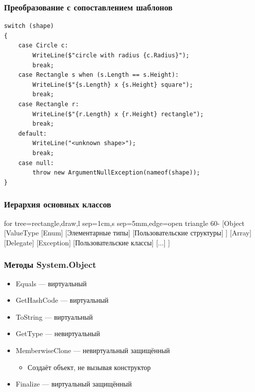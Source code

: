 \documentclass[xetex,mathserif,serif]{beamer}
\begin{document}
	\begin{frame}[fragile]
		\frametitle{Преобразование с сопоставлением шаблонов}
		\begin{small}
			\begin{verbatim}
switch (shape)
{
    case Circle c:
        WriteLine($"circle with radius {c.Radius}");
        break;
    case Rectangle s when (s.Length == s.Height):
        WriteLine($"{s.Length} x {s.Height} square");
        break;
    case Rectangle r:
        WriteLine($"{r.Length} x {r.Height} rectangle");
        break;
    default:
        WriteLine("<unknown shape>");
        break;
    case null:
        throw new ArgumentNullException(nameof(shape));
}
			\end{verbatim}
		\end{small}
\end{frame}

\begin{frame}
	\frametitle{Иерархия основных классов}
	\begin{tiny}
		\begin{forest}
			for tree={rectangle,draw,l sep=1cm,s sep=5mm,edge=open triangle 60-}
			[Object
				[ValueType
					[Enum]
					[Элементарные типы]
					[Пользовательские структуры]
				]
				[Array]
				[Delegate]
				[Exception]
				[Пользовательские классы]
				[...]
			]
		\end{forest}
	\end{tiny}
\end{frame}

\begin{frame}
	\frametitle{Методы System.Object}
	\begin{itemize}
		\item Equals --- виртуальный
		\item GetHashCode --- виртуальный
		\item ToString --- виртуальный
		\item GetType --- невиртуальный
		\item MemberwiseClone --- невиртуальный защищённый
		\begin{itemize}
			\item Создаёт объект, не вызывая конструктор
		\end{itemize}
		\item Finalize --- виртуальный защищённый
	\end{itemize}
\end{frame}
\end{document}
